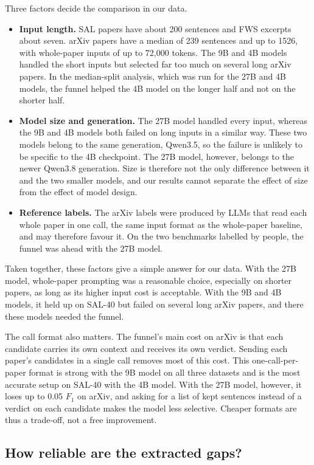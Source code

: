 Three factors decide the comparison in our data.
\begin{itemize}
  \item \textbf{Input length.} SAL papers have about 200 sentences and FWS excerpts about seven. arXiv papers have a median of 239 sentences and up to 1526, with whole-paper inputs of up to 72,000 tokens. The 9B and 4B models handled the short inputs but selected far too much on several long arXiv papers. In the median-split analysis, which was run for the 27B and 4B models, the funnel helped the 4B model on the longer half and not on the shorter half.
  \item \textbf{Model size and generation.} The 27B model handled every input, whereas the 9B and 4B models both failed on long inputs in a similar way. These two models belong to the same generation, Qwen3.5, so the failure is unlikely to be specific to the 4B checkpoint. The 27B model, however, belongs to the newer Qwen3.8 generation. Size is therefore not the only difference between it and the two smaller models, and our results cannot separate the effect of size from the effect of model design.
  \item \textbf{Reference labels.} The arXiv labels were produced by LLMs that read each whole paper in one call, the same input format as the whole-paper baseline, and may therefore favour it. On the two benchmarks labelled by people, the funnel was ahead with the 27B model.
\end{itemize}

Taken together, these factors give a simple answer for our data. With the 27B model, whole-paper prompting was a reasonable choice, especially on shorter papers, as long as its higher input cost is acceptable. With the 9B and 4B models, it held up on SAL-40 but failed on several long arXiv papers, and there these models needed the funnel.

The call format also matters. The funnel's main cost on arXiv is that each candidate carries its own context and receives its own verdict. Sending each paper's candidates in a single call removes most of this cost. This one-call-per-paper format is strong with the 9B model on all three datasets and is the most accurate setup on SAL-40 with the 4B model. With the 27B model, however, it loses up to 0.05 $F_1$ on arXiv, and asking for a list of kept sentences instead of a verdict on each candidate makes the model less selective. Cheaper formats are thus a trade-off, not a free improvement.

\subsection{How reliable are the extracted gaps?}
\label{sec:quality}


